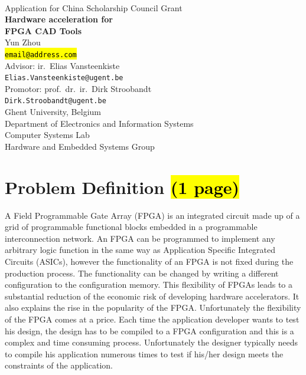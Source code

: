 \documentclass[a4paper,oneside,12pt]{article}
\begin{document}

\thispagestyle{empty}

\begin{center}
\mbox{}\\\vspace{5mm}
{\Large Application for China Scholarship Council Grant}\\ [45mm]
%
{\bf\Huge Hardware acceleration for\\
[3mm] FPGA CAD Tools} \\
\vspace{45mm}
\Large Yun Zhou \\
\vspace{2mm}
\small\texttt{\hl{email@address.com}} \\
\vspace{20mm}
\Large Advisor: ir.\ Elias Vansteenkiste \\
\small\texttt{Elias.Vansteenkiste@ugent.be} \\
\vspace{2mm}
\Large Promotor: prof.\ dr.\ ir.\ Dirk Stroobandt \\
\small\texttt{Dirk.Stroobandt@ugent.be} \\
\vspace{20mm}
\normalsize Ghent University, Belgium \\
\normalsize Department of Electronics and Information Systems\\
\normalsize Computer Systems Lab\\
\normalsize Hardware and Embedded Systems Group 
\end{center}

\newpage

\tableofcontents

\clearpage

\section{Problem Definition \hl{(1 page)}}
A Field Programmable Gate Array (FPGA) is an integrated circuit made up of a grid of programmable functional blocks embedded in a programmable interconnection network. An FPGA can be programmed to implement any arbitrary logic function in the same way as Application Specific Integrated Circuits (ASICs), however the functionality of an FPGA is not fixed during the production process. The functionality can be changed by writing a different configuration to the configuration memory. This flexibility of FPGAs leads to a substantial reduction of the economic risk of developing hardware accelerators. It also explains the rise in the popularity of the FPGA. Unfortunately the flexibility of the FPGA comes at a price.  Each time the application developer wants to test his design, the design has to be compiled to a FPGA configuration and this is a complex and time consuming process. Unfortunately the designer typically needs to compile his application numerous times to test if his/her design meets the constraints of the application. 
\end{document}
